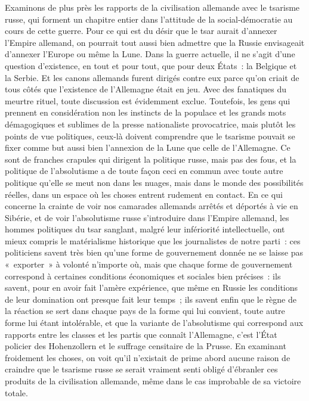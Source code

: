 \documentclass[french,twoside]{book} %
\begin{document}
\noindent Examinons de plus près les rapports de la civilisation allemande avec le tsarisme russe, qui forment un chapitre entier dans l’attitude de la social-démocratie au cours de cette guerre. Pour ce qui est du désir que le tsar aurait d’annexer l’Empire allemand, on pourrait tout aussi bien admettre que la Russie envisageait d’annexer l’Europe ou même la Lune. Dans la guerre actuelle, il ne s’agit d’une question d’existence, en tout et pour tout, que pour deux États : la Belgique et la Serbie. Et les canons allemands furent dirigés contre eux parce qu’on criait de tous côtés que l’existence de l’Allemagne était en jeu. Avec des fanatiques du meurtre rituel, toute discussion est évidemment exclue. Toutefois, les gens qui prennent en considération non les instincts de la populace et les grands mots démagogiques et sublimes de la presse nationaliste provocatrice, mais plutôt les points de vue politiques, ceux-là doivent comprendre que le  tsarisme pouvait se fixer comme but aussi bien l’annexion de la Lune que celle de l’Allemagne. Ce sont de franches crapules qui dirigent la politique russe, mais pas des fous, et la politique de l’absolutisme a de toute façon ceci en commun avec toute autre politique qu’elle se meut non dans les nuages, mais dans le monde des possibilités réelles, dans un espace où les choses entrent rudement en contact. En ce qui concerne la crainte de voir nos camarades allemands arrêtés et déportés à vie en Sibérie, et de voir l’absolutisme russe s’introduire dans l’Empire allemand, les hommes politiques du tsar sanglant, malgré leur infériorité intellectuelle, ont mieux compris le matérialisme historique que les journalistes de notre parti : ces politiciens savent très bien qu’une forme de gouvernement donnée ne se laisse pas « exporter » à volonté n’importe où, mais que chaque forme de gouvernement correspond à certaines conditions économiques et sociales bien précises : ils savent, pour en avoir fait l’amère expérience, que même en Russie les conditions de leur domination ont presque fait leur temps ; ils savent enfin que le règne de la réaction se sert dans chaque pays de la forme qui lui convient, toute autre forme lui étant intolérable, et que la variante de l’absolutisme qui correspond aux rapports entre les classes et les partis que connaît l’Allemagne, c’est l’État policier des Hohenzollern et le suffrage censitaire de la Prusse. En examinant froidement les choses, on voit qu’il n’existait de prime abord aucune raison de craindre que le tsarisme russe se serait vraiment senti obligé d’ébranler ces produits de la civilisation allemande, même dans le cas improbable de sa victoire totale.\par
\end{document}
